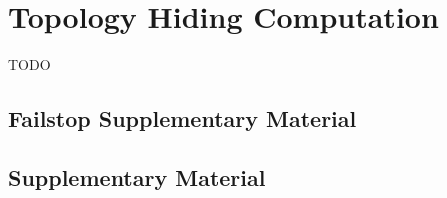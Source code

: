 \chapter{Topology Hiding Computation}
TODO










\section*{Failstop Supplementary Material}










\section*{Supplementary Material}






